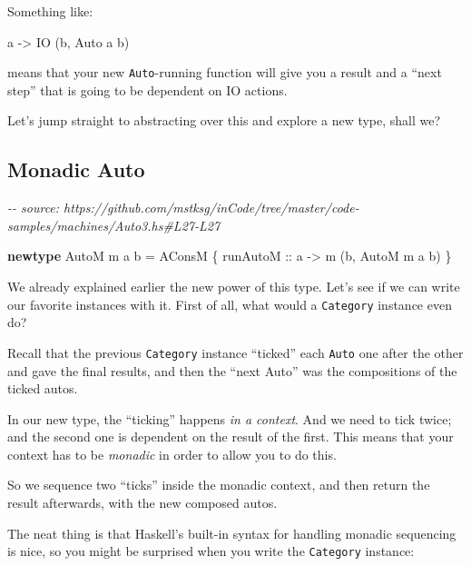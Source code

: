 \documentclass[]{article}
\newenvironment{Shaded}{}{}
\newcommand{\CommentTok}[1]{\textcolor[rgb]{0.38,0.63,0.69}{\textit{#1}}}
\newcommand{\DataTypeTok}[1]{\textcolor[rgb]{0.56,0.13,0.00}{#1}}
\newcommand{\KeywordTok}[1]{\textcolor[rgb]{0.00,0.44,0.13}{\textbf{#1}}}
\newcommand{\NormalTok}[1]{#1}
\newcommand{\OtherTok}[1]{\textcolor[rgb]{0.00,0.44,0.13}{#1}}
\begin{document}
Something like:

\begin{Shaded}
\begin{Highlighting}[]
\NormalTok{a }\OtherTok{{-}\textgreater{}} \DataTypeTok{IO}\NormalTok{ (b, }\DataTypeTok{Auto}\NormalTok{ a b)}
\end{Highlighting}
\end{Shaded}

means that your new \texttt{Auto}-running function will give you a result and a
``next step'' that is going to be dependent on IO actions.

Let's jump straight to abstracting over this and explore a new type, shall we?

\subsection{Monadic Auto}\label{monadic-auto}

\begin{Shaded}
\begin{Highlighting}[]
\CommentTok{{-}{-} source: https://github.com/mstksg/inCode/tree/master/code{-}samples/machines/Auto3.hs\#L27{-}L27}

\KeywordTok{newtype} \DataTypeTok{AutoM}\NormalTok{ m a b }\OtherTok{=} \DataTypeTok{AConsM}\NormalTok{ \{}\OtherTok{ runAutoM ::}\NormalTok{ a }\OtherTok{{-}\textgreater{}}\NormalTok{ m (b, }\DataTypeTok{AutoM}\NormalTok{ m a b) \}}
\end{Highlighting}
\end{Shaded}

We already explained earlier the new power of this type. Let's see if we can
write our favorite instances with it. First of all, what would a
\texttt{Category} instance even do?

Recall that the previous \texttt{Category} instance ``ticked'' each
\texttt{Auto} one after the other and gave the final results, and then the
``next Auto'' was the compositions of the ticked autos.

In our new type, the ``ticking'' happens \emph{in a context}. And we need to
tick twice; and the second one is dependent on the result of the first. This
means that your context has to be \emph{monadic} in order to allow you to do
this.

So we sequence two ``ticks'' inside the monadic context, and then return the
result afterwards, with the new composed autos.

The neat thing is that Haskell's built-in syntax for handling monadic sequencing
is nice, so you might be surprised when you write the \texttt{Category}
instance:
\end{document}
